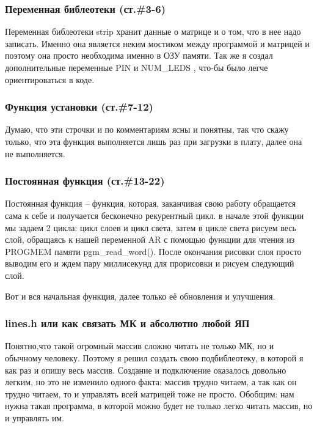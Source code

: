 \documentclass[a4paper, 12pt]{article}
\begin{document}
\newpage
\subsubsection{Переменная библеотеки (ст.\#3-6)}

Переменная библеотеки strip хранит данные о матрице и о том, что в нее надо
записать. Именно она является неким мостиком между программой и матрицей и
поэтому она просто необходима именно в ОЗУ памяти. Так же я создал
дополнительные переменные PIN и NUM\_LEDS , что-бы было легче ориентироваться в
коде.

\subsubsection{Функция установки (ст.\#7-12)}

Думаю, что эти строчки и по комментариям ясны и  понятны, так что скажу только,
что эта функция выполняется лишь раз при загрузки в плату, далее она не
выполняется.

\subsubsection{Постоянная функция (ст.\#13-22)}

Постоянная функция -- функция, которая, заканчивая свою работу обращается сама
к себе и получается бесконечно рекурентный цикл. в начале этой функции мы
задаем 2 цикла: цикл слоев и цикл света, затем в цикле света рисуем весь слой,
обращаясь к нашей переменной AR с помощью функции для чтения из PROGMEM памяти
pgm\_read\_word(). После окончания рисовки слоя просто выводим его и ждем пару
миллисекунд для прорисовки и рисуем следующий слой.

Вот и вся начальная функция, далее только её обновления и улучшения.

\subsubsection{lines.h или как связать МК и абсолютно любой ЯП}

Понятно,что такой огромный массив сложно читать не только МК, но и обычному
человеку. Поэтому я решил создать свою подбиблеотеку, в которой я как раз
и опишу весь массив. Создание и подключение оказалось довольно легким, но это
не изменило одного факта: массив трудно читаем, а так как он трудно читаем, то
и управлять всей матрицей тоже не просто. Обобщим: нам нужна такая программа,
в которой можно будет не только легко читать массив, но и управлять им.
\end{document}
